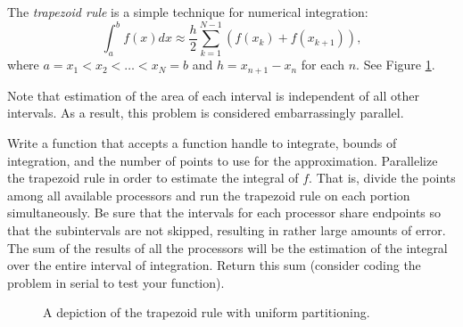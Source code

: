 \begin{problem}
The \emph{trapezoid rule} is a simple technique for numerical integration:
\[
\int_{a}^b f(x) dx \approx \frac{h}{2} \sum_{k=1}^{N-1} (f(x_{k}) + f(x_{k+1})),
\]
where $a = x_1 < x_2 < \ldots < x_N = b$ and $h = x_{n+1} - x_{n}$ for each $n$.
See Figure \ref{fig:parallel-intro-traprule}.


Note that estimation of the area of each interval is independent of all other intervals.
As a result, this problem is considered embarrassingly parallel.

Write a function that accepts a function handle to integrate, bounds of integration, and the number of points to use for the approximation.
Parallelize the trapezoid rule in order to estimate the integral of $f$.
That is, divide the points among all available processors and run the trapezoid rule on each portion simultaneously.
Be sure that the intervals for each processor share endpoints so that the subintervals are not skipped, resulting in rather large amounts of error.
The sum of the results of all the processors will be the estimation of the integral over the entire interval of integration.
Return this sum (consider coding the problem in serial to test your function).

\begin{figure}[H]

\begin{center}

\end{center}
\caption{A depiction of the trapezoid rule with uniform partitioning.}
\label{fig:parallel-intro-traprule}
\end{figure}
\end{problem}


